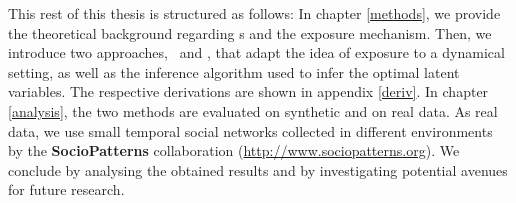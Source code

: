 This rest of this thesis is structured as follows: 
In chapter \ref{methods}, we provide the theoretical background regarding \sbm s and the exposure mechanism. 
Then, we introduce two approaches, \expm\ and \exph, that adapt the idea of exposure to a dynamical setting,
as well as the inference algorithm used to infer the optimal latent variables. 
The respective derivations are shown in appendix \ref{deriv}.
In chapter \ref{analysis}, the two methods are evaluated on synthetic and on real data. 
As real data, we use small temporal social networks collected  in different environments 
\cite{primaryschool, highschool, hospital, workplace01, workplace02}
by the \textbf{SocioPatterns} collaboration (\url{http://www.sociopatterns.org}).
We conclude by analysing the obtained results and by investigating potential avenues for future research.
